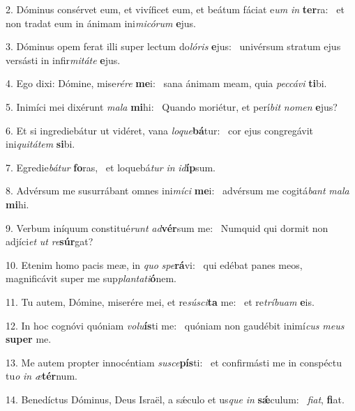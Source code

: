 2. Dóminus consérvet eum, et vivíficet eum, et beátum fáciat e\textit{um} \textit{in} \textbf{ter}ra: \ast\  et non tradat eum in ánimam ini\textit{mi}\textit{có}\textit{rum} \textbf{e}jus.\

3. Dóminus opem ferat illi super lectum do\textit{ló}\textit{ris} \textbf{e}jus: \ast\  univérsum stratum ejus versásti in infir\textit{mi}\textit{tá}\textit{te} \textbf{e}jus.\

4. Ego dixi: Dómine, mise\textit{ré}\textit{re} \textbf{me}i: \ast\  sana ánimam meam, quia \textit{pec}\textit{cá}\textit{vi} \textbf{ti}bi.\

5. Inimíci mei dixérunt \textit{ma}\textit{la} \textbf{mi}hi: \ast\  Quando moriétur, et perí\textit{bit} \textit{no}\textit{men} \textbf{e}jus?\

6. Et si ingrediebátur ut vidéret, vana \textit{lo}\textit{que}\textbf{bá}tur: \ast\  cor ejus congregávit ini\textit{qui}\textit{tá}\textit{tem} \textbf{si}bi.\

7. Egredie\textit{bá}\textit{tur} \textbf{fo}ras, \ast\  et loquebá\textit{tur} \textit{in} \textit{id}\textbf{íp}sum.\

8. Advérsum me susurrábant omnes ini\textit{mí}\textit{ci} \textbf{me}i: \ast\  advérsum me cogitá\textit{bant} \textit{ma}\textit{la} \textbf{mi}hi.\

9. Verbum iníquum constitué\textit{runt} \textit{ad}\textbf{vér}sum me: \ast\  Numquid qui dormit non adjíci\textit{et} \textit{ut} \textit{re}\textbf{súr}gat?\

10. Etenim homo pacis meæ, in \textit{quo} \textit{spe}\textbf{rá}vi: \ast\  qui edébat panes meos, magnificávit super me sup\textit{plan}\textit{ta}\textit{ti}\textbf{ó}nem.\

11. Tu autem, Dómine, miserére mei, et re\textit{sú}\textit{sci}\textbf{ta} me: \ast\  et re\textit{trí}\textit{bu}\textit{am} \textbf{e}is.\

12. In hoc cognóvi quóniam \textit{vo}\textit{lu}\textbf{ís}ti me: \ast\  quóniam non gaudébit inimí\textit{cus} \textit{me}\textit{us} \textbf{su}\textbf{per} me.\

13. Me autem propter innocéntiam \textit{su}\textit{sce}\textbf{pís}ti: \ast\  et confirmásti me in conspéctu tu\textit{o} \textit{in} \textit{æ}\textbf{tér}num.\

14. Benedíctus Dóminus, Deus Israël, a sǽculo et us\textit{que} \textit{in} \textbf{sǽ}culum: \ast\  \textit{fi}\textit{at}, \textbf{fi}at.\


